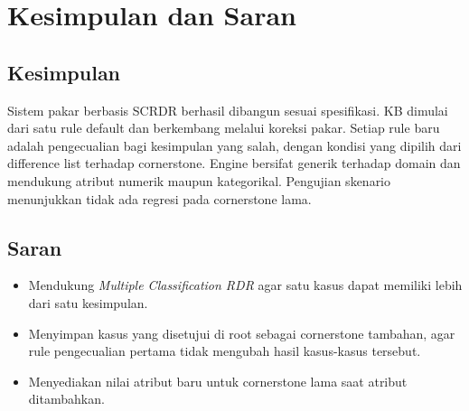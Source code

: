 \documentclass[11pt,a4paper]{article}
\begin{document}
\section{Kesimpulan dan Saran}

\subsection{Kesimpulan}
Sistem pakar berbasis SCRDR berhasil dibangun sesuai spesifikasi. KB dimulai dari satu rule
default dan berkembang melalui koreksi pakar. Setiap rule baru adalah pengecualian bagi
kesimpulan yang salah, dengan kondisi yang dipilih dari difference list terhadap cornerstone.
Engine bersifat generik terhadap domain dan mendukung atribut numerik maupun kategorikal.
Pengujian skenario menunjukkan tidak ada regresi pada cornerstone lama.

\subsection{Saran}
\begin{itemize}[nosep]
  \item Mendukung \emph{Multiple Classification RDR} agar satu kasus dapat memiliki lebih dari
        satu kesimpulan.
  \item Menyimpan kasus yang disetujui di root sebagai cornerstone tambahan, agar rule
        pengecualian pertama tidak mengubah hasil kasus-kasus tersebut.
  \item Menyediakan nilai atribut baru untuk cornerstone lama saat atribut ditambahkan.
\end{itemize}

\end{document}

